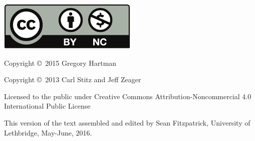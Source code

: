 \noindent\hskip -1in\begin{minipage}{2in}
\includegraphics{text/by-nc} 
\end{minipage}
\begin{minipage}{3in}
\noindent Copyright \copyright\ 2015 Gregory Hartman

\noindent Copyright \copyright\ 2013 Carl Stitz and Jeff Zeager

Licensed to the public under Creative Commons Attribution-Noncommercial 4.0 International Public License
\end{minipage}

\bigskip

\bigskip



\bigskip

This version of the text assembled and edited by Sean Fitzpatrick, University of Lethbridge, May-June, 2016. 
